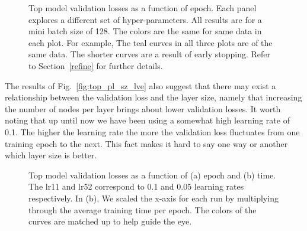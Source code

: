 \documentclass[12pt,journal,compsoc]{IEEEtran}
\begin{document}
\begin{figure}
\caption{Top model validation losses as a function of epoch. Each panel explores a different set of hyper-parameters. All results are for a mini batch size of 128. The colors are the same for same data in each plot.  For example, The teal curves in all three plots are of the same data. The shorter curves are a result of early stopping. Refer to Section~\ref{refine} for further details.}
\label{fig:top2_nl_sz_lr}
\vspace*{1pt}
\end{figure}

The results of Fig.~\ref{fig:top_pl_sz_lve} also suggest that there may exist a relationship between the validation loss and the layer size, namely that increasing the number of nodes per layer brings about lower validation losses. It worth noting that up until now we have been using a somewhat high learning rate of 0.1. The higher the learning rate the more the validation loss fluctuates from one training epoch to the next. This fact makes it hard to say one way or another which layer size is better. 

\begin{figure}%
\caption{Top model validation losses as a function of (a) epoch and (b) time. The lr11 and lr52 correspond to 0.1 and 0.05 learning rates respectively.  In (b), We scaled the x-axis for each run by multiplying through the average training time per epoch. The colors of the curves are matched up to help guide the eye.}
\label{fig:top3_lr_bs}
\vspace*{1pt}
\end{figure}
\end{document}

